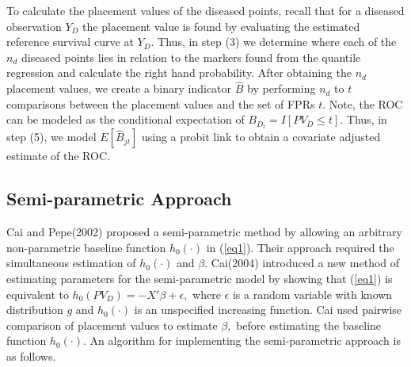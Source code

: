 \documentclass{interact}
\theoremstyle{definition}
\begin{document}


To calculate the placement values of the diseased points, recall that for a diseased observation $Y_D$ the placement value is found by evaluating the estimated reference survival curve at $Y_D.$  Thus, in step (3) we determine where each of the $n_d$ diseased points lies in relation to the markers found from the quantile regression and calculate the right hand probability.  After obtaining the $n_d$ placement values, we create a binary indicator $\hat{B}$ by performing $n_d$ to $t$ comparisons between the placement values and the set of FPRs $t$.  
Note,  the ROC can be modeled as the conditional expectation of $B_{D_t} = I[PV_D \leq t].$  Thus, in step (5), we model $E[\hat{B}_{jt}]$ using a probit link to obtain a covariate adjusted estimate of the ROC.


\subsection{Semi-parametric Approach}
Cai and Pepe(2002) proposed a semi-parametric method by allowing an arbitrary non-parametric baseline function $h_0(\cdot)$ in (\ref{eq1}).
  Their approach required the  simultaneous estimation of $h_0(\cdot)$ and $\beta$.  Cai(2004) introduced a new method of estimating parameters for the semi-parametric model by showing that (\ref{eq1}) is equivalent to $h_0(PV_D) = - X'\beta + \epsilon,$ where $\epsilon$ is a random variable with known distribution $g$ and $h_0(\cdot)$ is an unspecified increasing function.  
Cai used  pairwise comparison of placement values to estimate $\beta,$ before estimating  the baseline function $h_0(\cdot).$ 
An algorithm for implementing the semi-parametric approach is as follows.
\end{document}
